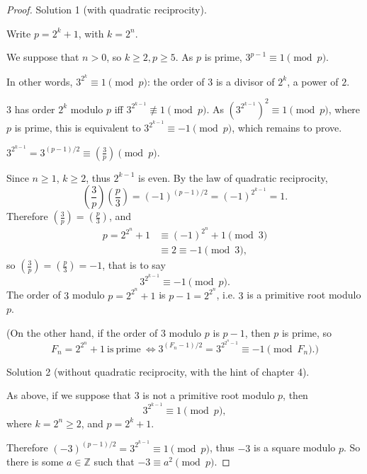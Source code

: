 \documentclass[11pt,a4paper]{article}
\newcommand{\Z}{\mathbb{Z}}
\newcommand{\legendre}[2]{\genfrac{(}{)}{}{}{#1}{#2}}
\begin{document}
\begin{proof}

Solution 1 (with quadratic reciprocity).

Write $p = 2^k + 1$, with $k = 2^n$.

We suppose that $n>0$, so $k\geq 2, p \geq 5$. As $p$ is prime, $3^{p-1} \equiv 1 \pmod p$. 

In other words, $3^{2^k} \equiv 1 \pmod p$: the order of $3$ is a divisor of $2^k$, a power of $2$.

$3$ has order $2^k$ modulo $p$ iff $3^{2^{k-1}} \not \equiv 1 \pmod p$. As $\left (3^{2^{k-1}} \right)^2 \equiv 1 \pmod p$, where $p$ is prime, this is equivalent to $3^{2^{k-1}}  \equiv -1 \pmod p$, which remains to prove.

$3^{2^{k-1}} = 3^{(p-1)/2} \equiv \legendre{3}{p} \pmod p$.

Since $n\geq 1$, $k\geq 2$, thus $2^{k-1}$ is even.
By the law of quadratic reciprocity,
$$\legendre{3}{p} \legendre{p}{3} = (-1)^{(p-1)/2} = (-1)^{2^{k-1}} = 1.$$
Therefore $\legendre{3}{p} = \legendre{p}{3}$, and
\begin{align*}
p = 2^{2^n}+1 &\equiv (-1)^{2^n} + 1 \pmod 3\\
&\equiv 2 \equiv -1 \pmod 3,
\end{align*}
so $\legendre{3}{p} = \legendre {p}{3} = -1$, that is to say
$$3^{2^{k-1}}  \equiv -1 \pmod p.$$
The order of $3$ modulo $p = 2^{2^n} + 1$ is $p-1 = 2^{2^n}$, i.e. $3$ is a primitive root modulo $p$.

(On the other hand, if the order of $3$ modulo $p$ is $p-1$, then $p$ is prime, so
$$ F_n = 2^{2^n} + 1 \ \mathrm{is}\ \mathrm{prime}\ \iff 3^{(F_n-1)/2} = 3^{2^{2^n - 1}} \equiv -1 \pmod {F_n}.)$$

\bigskip

Solution 2 (without quadratic reciprocity, with the hint of  chapter 4).

As above, if we suppose that $3$ is not a primitive root modulo $p$, then 
$$3^{2^{k-1}}  \equiv 1 \pmod p,$$
where $k=2^n \geq 2$, and $p = 2^k+1$.

Therefore $(-3)^{(p-1)/2} = 3^{2^{k-1}}  \equiv 1 \pmod p$, thus $-3$ is a square modulo $p$. So there is some $a \in \Z$ such that $-3 \equiv a^2 \pmod p$. 


\end{proof}
\end{document}
